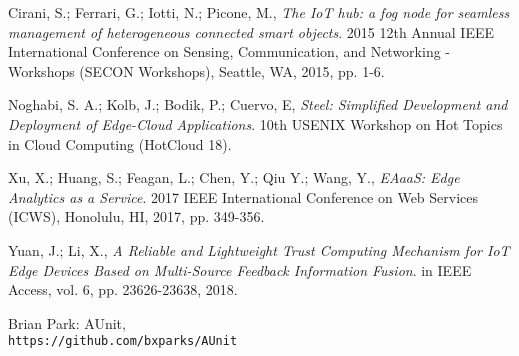 \documentclass[a4paper,12pt,oneside]{book}
\begin{document}
\begin{thebibliography}{9}
	Cirani, S.; Ferrari, G.; Iotti, N.; Picone, M., 
	\textit{The IoT hub: a fog node for seamless management of heterogeneous connected smart objects}. 
	2015 12th Annual IEEE International Conference on Sensing, Communication, and Networking - Workshops (SECON Workshops), Seattle, WA, 2015, pp. 1-6.
	
	Noghabi, S. A.; Kolb, J.; Bodik, P.; Cuervo, E, 
	\textit{Steel: Simplified Development and Deployment of Edge-Cloud Applications}. 
	10th {USENIX} Workshop on Hot Topics in Cloud Computing (HotCloud 18).
	
	Xu, X.; Huang, S.; Feagan, L.; Chen, Y.; Qiu Y.; Wang, Y., 
	\textit{EAaaS: Edge Analytics as a Service}.
	2017 IEEE International Conference on Web Services (ICWS), Honolulu, HI, 2017, pp. 349-356.
	
	Yuan, J.; Li, X., 
	\textit{A Reliable and Lightweight Trust Computing Mechanism for IoT Edge Devices Based on Multi-Source Feedback Information Fusion}. 
	in IEEE Access, vol. 6, pp. 23626-23638, 2018.
	
	Brian Park: AUnit,
	\\\texttt{https://github.com/bxparks/AUnit}
	
	
\end{thebibliography}
\end{document}
